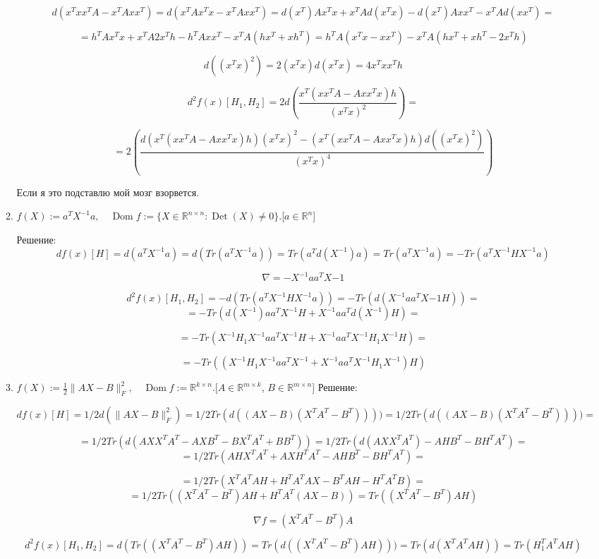 \documentclass{article}
\newcommand{\R}{\mathbb{R}}
\DeclareMathOperator*{\Det}{Det}
\DeclareMathOperator*{\Dom}{Dom}
\begin{document}
\begin{enumerate}[label=\textbf{\arabic*}, leftmargin=0em]
\begin{enumerate}
$$
d(x^Tx x^TA - x^T A x x^T) = d(x^TAx^Tx - x^T A x x^T) = d(x^T)Ax^Tx + x^TAd(x^Tx) - d(x^T) A x x^T - x^TAd(xx^T) =
$$

$$
= h^TAx^Tx + x^TA2x^Th - h^T A x x^T - x^TA(hx^T + xh^T) = h^TA(x^Tx - x x^T) - x^TA(hx^T + xh^T - 2x^Th )
$$

$$
d((x^T x)^2) = 2(x^Tx)d(x^Tx) = 4x^Txx^Th
$$

$$
d^2 f(x)[H_1, H_2] = 2d\left(\frac{x^T(x x^TA - A x x^T x)h}{(x^T x)^2}\right) =
$$

$$
= 2\left(\frac{d(x^T(x x^TA - A x x^T x)h)(x^T x)^2 - (x^T(x x^TA - A x x^T x)h)d((x^T x)^2)}{(x^T x)^4}\right)
$$

Если я это подставлю мой мозг взорвется.

\item $\displaystyle f(X) := a^T X^{-1} a, \quad \Dom f := \{ X \in \R^{n \times n} : \Det(X) \neq 0 \}$.\hfill[$a \in \R^n$]

Решение:
$$
df(x)[H] = d(a^T X^{-1} a) = d(Tr(a^T X^{-1} a))= Tr(a^T d(X^{-1}) a) = Tr(a^T X^{-1} a) = -Tr(a^T X^{-1}HX^{-1} a)
$$

$$
\nabla = -X^{-1}aa^TX{-1}
$$

$$
d^2 f(x)[H_1, H_2] = -d(Tr(a^T X^{-1}HX^{-1} a)) = -Tr(d(X^{-1}aa^TX{-1}H)) =
$$
$$
=  -Tr(d(X^{-1})aa^TX^{-1}H + X^{-1}aa^Td(X^{-1})H) =
$$

$$
= -Tr(X^{-1}H_1X^{-1}aa^TX^{-1}H + X^{-1}aa^TX^{-1}H_1X^{-1}H) =
$$

$$
= -Tr((X^{-1}H_1X^{-1}aa^TX^{-1} + X^{-1}aa^TX^{-1}H_1X^{-1})H)
$$

\item $\displaystyle f(X) := \frac{1}{2} \| A X - B \|_F^2, \quad \Dom f := \R^{k \times n}$.\hfill[$A \in \R^{m \times k}$, $B \in \R^{m \times n}$]
Решение:

$$
df(x)[H] = 1/2 d(\| A X - B \|_F^2) = 1/2  Tr(d((A X - B)(X^TA^T - B^T)))) = 1/2 Tr(d((A X - B)(X^TA^T - B^T)))) =
$$

$$
= 1/2 Tr(d(AXX^TA^T - AXB^T - BX^TA^T + BB^T)) = 1/2 Tr(d(AXX^TA^T) - AHB^T - BH^TA^T) =
$$
$$
= 1/2 Tr(AHX^TA^T + AXH^TA^T - AHB^T - BH^TA^T)=
$$

$$
= 1/2 Tr(X^TA^TAH + H^TA^TAX- B^TAH - H^TA^TB) =
$$
$$
= 1/2 Tr((X^TA^T - B^T)AH +H^TA^T (AX - B)) = Tr((X^TA^T - B^T)AH)
$$

$$
\nabla f = (X^TA^T - B^T)A
$$


$$
d^2 f(x)[H_1, H_2] = d(Tr((X^TA^T - B^T)AH)) = Tr(d((X^TA^T - B^T)AH))) = Tr(d(X^TA^TAH)) = Tr(H_1^TA^TAH)
$$



\end{enumerate}
\end{enumerate}
\end{document}
